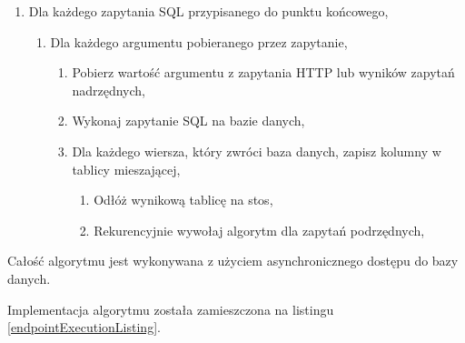 \begin{enumerate}

    \item Dla każdego zapytania SQL przypisanego do punktu końcowego,

        \begin{enumerate}

            \item Dla każdego argumentu pobieranego przez zapytanie,

                \begin{enumerate}

                    \item Pobierz wartość argumentu z zapytania HTTP lub wyników
                        zapytań nadrzędnych,

                    \item Wykonaj zapytanie SQL na bazie danych,

                    \item Dla każdego wiersza, który zwróci baza danych, zapisz
                        kolumny w tablicy mieszającej,

                        \begin{enumerate}

                            \item Odłóż wynikową tablicę na stos,

                            \item Rekurencyjnie wywołaj algorytm dla zapytań
                                podrzędnych,

                        \end{enumerate}

                \end{enumerate}

        \end{enumerate}

\end{enumerate}

Całość algorytmu jest wykonywana z użyciem asynchronicznego dostępu do bazy
danych.

Implementacja algorytmu została zamieszczona na listingu
\ref{endpointExecutionListing}.

\clearpage


